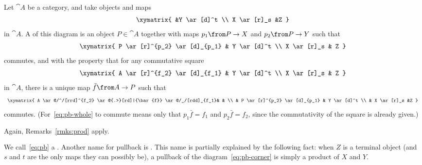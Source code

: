 \begin{defn}    
\label{defn:pb}
Let $\cat{A}$ be a category, and take objects and maps
% 
\begin{equation}        
\label{eq:pb-corner}
\begin{array}{c}
\xymatrix{
                &Y \ar[d]^t     \\
X \ar[r]_s      &Z
}
\end{array}
\end{equation}
% 
in $\cat{A}$.  A %
%
%
of this diagram is an object $P \in \cat{A}$ together with maps $p_1\from P
\to X$ and $p_2\from P \to Y$ such that
% 
\begin{equation}        
\label{eq:pb}
\begin{array}{c}
\xymatrix{
P \ar[r]^{p_2} \ar[d]_{p_1}     &
Y \ar[d]^t      \\
X \ar[r]_s      &
Z
}
\end{array}
\end{equation}
% 
commutes, and with the property that for any commutative square
% 
\begin{equation}        
\label{eq:pb-cone}
\begin{array}{c}
\xymatrix{
A \ar[r]^{f_2} \ar[d]_{f_1}     &
Y \ar[d]^t      \\
X \ar[r]_s      &
Z
}
\end{array}
\end{equation}
% 
in $\cat{A}$, there is a unique map $\bar{f}\from A \to P$ such that
% 
\begin{equation}        
\label{eq:pb-whole}
\begin{array}{c}
\xymatrix{
A \ar@/^/[rrd]^{f_2} \ar@{.>}[rd]|{\bar{f}} \ar@/_/[rdd]_{f_1}&       
        &       \\
        &
P \ar[r]^{p_2} \ar[d]_{p_1}     &
Y \ar[d]^t      \\
        &
X \ar[r]_s      &Z
}
\end{array}
\end{equation}
% 
commutes.  (For~\eqref{eq:pb-whole} to commute means only that $p_1 \bar{f}
= f_1$ and $p_2 \bar{f} = f_2$, since the commutativity of the square is
already given.)
\end{defn}

Again, Remarks~\ref{rmks:prod} apply.  

We call~\eqref{eq:pb} a .  Another name for pullback is .  This name is partially explained by the following fact: when $Z$
is a terminal object (and $s$ and $t$ are the only maps they can possibly
be), a pullback of the diagram~\eqref{eq:pb-corner} is simply a product%
%
%
of $X$ and $Y$.

